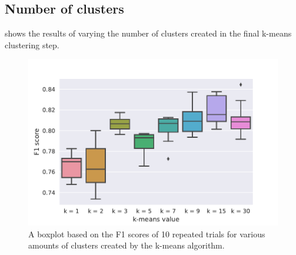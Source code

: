 \subsection{Number of clusters}
 shows the results of varying the number of clusters
created in the final k-means clustering step.
\begin{figure}[htbp]
  \centering
    \centering
    \includegraphics[width=\textwidth]{./figures/results/kmeans/boxplot_f1.pdf}
    \caption{A boxplot based on the F1 scores of 10 repeated trials for various
    amounts of clusters created by the k-means algorithm.}%
    \label{fig:kmeans_box}
\end{figure}

\FloatBarrier%

